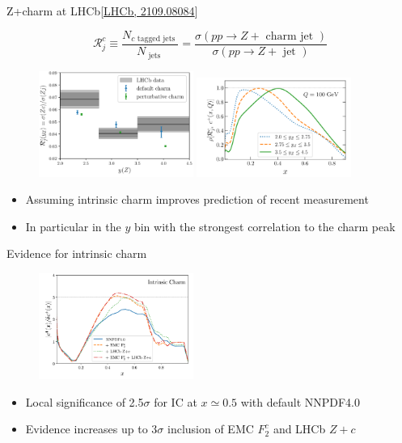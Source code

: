 \documentclass[aspectratio=43, 8pt,t]{beamer}
\begin{document}
\begin{frame}{Z+charm at LHCb}{\color{gray}\footnotesize [\hyperlink{https://arxiv.org/abs/2109.08084}{LHCb, 2109.08084}]}

  \begin{equation*}
    \mathcal{R}_j^c \equiv \frac{N_{c \text { tagged jets }}}{N_\text { jets }  }=\frac{\sigma\left(p p \rightarrow Z+\text { charm jet } \right)}{\sigma\left(p p \rightarrow Z+\text { jet }  \right)}
  \end{equation*}
  \begin{figure}
    \includegraphics[width=0.45\textwidth]{lhcb_data.png}
    \includegraphics[width=0.45\textwidth]{charm_Rjet_corr.png}
  \end{figure}
  \begin{itemize}
    \item Assuming intrinsic charm improves prediction of recent measurement
    \item In particular in the $y$ bin with the strongest correlation to the charm peak
  \end{itemize}
\end{frame}

\begin{frame}{Evidence for intrinsic charm}
  \begin{figure}
    \includegraphics[width=0.45\textwidth]{ic_f2c_zc.png}
  \end{figure}
  \begin{itemize}
    \item Local significance of 2.5$\sigma$ for IC at $x\simeq 0.5$ with default NNPDF4.0
    \item Evidence increases up to 3$\sigma$ inclusion of EMC $F_2^c$ and LHCb $Z+c$
  \end{itemize}
\end{frame}
\end{document}
